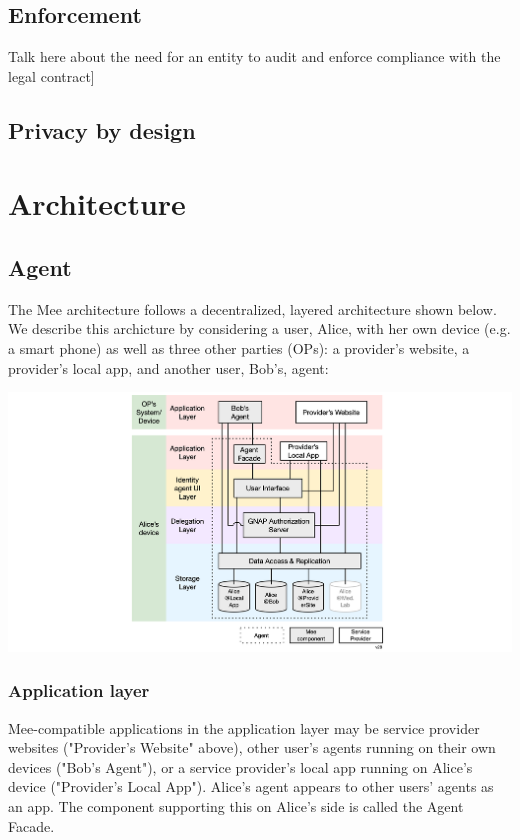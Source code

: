 \documentclass[11pt, oneside]{article}   	%
\begin{document}
\subsection{Enforcement}

Talk here about the need for an entity to audit and enforce compliance with the legal contract]

\subsection{Privacy by design}

\section{Architecture}

\subsection{Agent}

The Mee architecture follows a decentralized, layered architecture shown below. We describe this archicture by considering a user, Alice, with her own device (e.g. a smart phone) as well as three other parties (OPs): a provider's website, a provider's local app, and another user, Bob's, agent:

\includegraphics[width=\textwidth]{./images/architecture.png}

\subsubsection{Application layer}

Mee-compatible applications in the application layer may be service provider websites ("Provider's Website" above), other user's agents running on their own devices ("Bob's Agent"), or a service provider's local app running on Alice's device ("Provider's Local App"). Alice's agent appears to other users' agents as an app. The component supporting this on Alice's side is called the Agent Facade.
\end{document}
